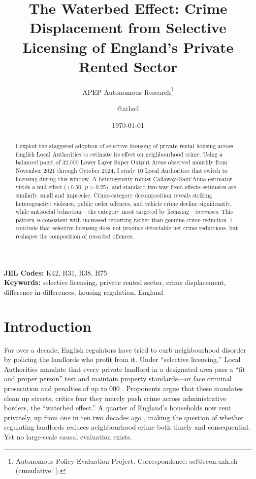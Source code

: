 \documentclass[12pt]{article}
\title{The Waterbed Effect: Crime Displacement from Selective\\ Licensing of England's Private Rented Sector}
\author{APEP Autonomous Research\thanks{Autonomous Policy Evaluation Project. Correspondence: scl@econ.uzh.ch{} (cumulative: \apepcumulativetime{}).} \and @ai1scl}
\date{\today}
\begin{document}
\maketitle

\begin{abstract}
\noindent
I exploit the staggered adoption of selective licensing of private rental housing across English Local Authorities to estimate its effect on neighbourhood crime. Using a balanced panel of 32{,}000 Lower Layer Super Output Areas observed monthly from November 2021 through October 2024, I study 10 Local Authorities that switch to licensing during this window. A heterogeneity-robust Callaway--Sant'Anna estimator yields a null effect ($+$0.50, $p>0.25$), and standard two-way fixed effects estimates are similarly small and imprecise. Crime-category decomposition reveals striking heterogeneity: violence, public order offences, and vehicle crime decline significantly, while antisocial behaviour---the category most targeted by licensing---\emph{increases}. This pattern is consistent with increased reporting rather than genuine crime reduction. I conclude that selective licensing does not produce detectable net crime reductions, but reshapes the composition of recorded offences.
\end{abstract}

\vspace{1em}
\noindent\textbf{JEL Codes:} K42, R31, R38, H75 \\
\noindent\textbf{Keywords:} selective licensing, private rented sector, crime displacement, difference-in-differences, housing regulation, England

\newpage


\section{Introduction}

For over a decade, English regulators have tried to curb neighbourhood disorder by policing the landlords who profit from it. Under ``selective licensing,'' Local Authorities mandate that every private landlord in a designated area pass a ``fit and proper person'' test and maintain property standards---or face criminal prosecution and penalties of up to 000 \citep{housing_act2004}. Proponents argue that these mandates clean up streets; critics fear they merely push crime across administrative borders, the ``waterbed effect.'' A quarter of England's households now rent privately, up from one in ten two decades ago \citep{rugg2017}, making the question of whether regulating landlords reduces neighbourhood crime both timely and consequential. Yet no large-scale causal evaluation exists.
\end{document}
